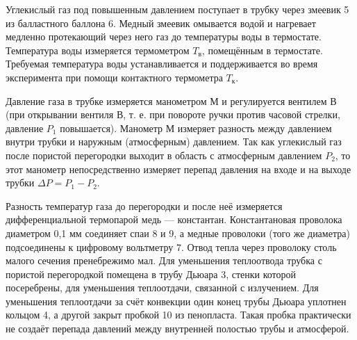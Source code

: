 \documentclass[12pt,a4paper]{article}
\begin{document}
Углекислый газ под повышенным давлением поступает в трубку через змеевик 5 из балластного баллона 6. 
Медный змеевик омывается водой и нагревает медленно протекающий через него газ до температуры воды в термостате. 
Температура воды измеряется термометром $T_в$, помещённым в термостате. 
Требуемая температура воды устанавливается и поддерживается во время эксперимента при помощи контактного термометра $T_к$.

Давление газа в трубке измеряется манометром М и регулируется вентилем В (при открывании вентиля В, т. е. при повороте ручки против часовой стрелки, давление $P_1$ повышается). 
Манометр М измеряет разность между давлением внутри трубки и наружным (атмосферным) давлением. Так как углекислый газ после пористой перегородки выходит в область с атмосферным давлением $P_2$, то этот манометр непосредственно измеряет перепад давления на входе и на выходе трубки $\Delta P = P_1 - P_2$.

Разность температур газа до перегородки и после неё измеряется дифференциальной термопарой медь — константан. 
Константановая проволока диаметром 0,1 мм соединяет спаи 8 и 9, а медные проволоки (того же диаметра) подсоединены к цифровому вольтметру 7. 
Отвод тепла через проволоку столь малого сечения пренебрежимо мал. 
Для уменьшения теплоотвода трубка с пористой перегородкой помещена в трубу Дьюара 3, стенки которой посеребрены, для уменьшения теплоотдачи, связанной с излучением. 
Для уменьшения теплоотдачи за счёт конвекции один конец трубы Дьюара уплотнен кольцом 4, а другой закрыт пробкой 10 из пенопласта. 
Такая пробка практически не создаёт перепада давлений между внутренней полостью трубы и атмосферой.
\end{document}
